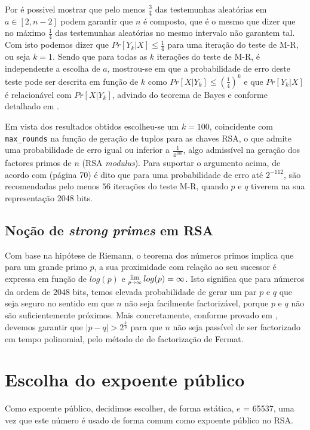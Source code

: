 \documentclass[dvipsnames]{article}
\newcommand{\Lim}[1]{\raisebox{0.5ex}{\scalebox{0.8}{$\displaystyle \lim_{#1}\;$}}}
\begin{document}

\noindent Por \cite{DBLP:journals/dcc/Lenstra00} é possivel mostrar que pelo menos $\frac{3}{4}$ das testemunhas aleatórias em $a \in [2,n-2]$ podem garantir que $n$ é composto, que é o mesmo que dizer que no máximo $\frac{1}{4}$ das testemunhas aleatórias no mesmo intervalo não garantem tal. Com isto podemos dizer que $Pr[Y_k|X] \leq \frac{1}{4}$ para uma iteração do teste de M-R, ou seja $k=1$. Sendo que para todas as $k$ iterações do teste de M-R, é independente a escolha de $a$, mostrou-se em \cite{1204.1657v2} que a probabilidade de erro deste teste pode ser descrita em função de $k$ como $Pr[X|Y_k] \leq (\frac{1}{4})^k$ e que $Pr[Y_k|X]$ é relacionável com $Pr[X|Y_k]$, advindo do teorema de Bayes e conforme detalhado em \cite{1709.09963}.

\vskip 0.4cm

\noindent Em vista dos resultados obtidos escolheu-se um $k=100$, coincidente com \texttt{max\_rounds} na função de geração de tuplos para as chaves RSA, o que admite uma probabilidade de erro igual ou inferior a $\frac{1}{4^{100}}$, algo admissível na geração dos factores primos de $n$ (RSA \textit{modulus}). Para suportar o argumento acima, de acordo com \cite{FIPS} (página 70) é dito que para uma probabilidade de erro até $2^{-112}$, são recomendadas pelo menos $56$ iterações do teste M-R, quando $p$ e $q$ tiverem na sua representação 2048 bits.

\subsection{Noção de \textit{strong primes} em RSA}

Com base na hipótese de Riemann, o teorema dos números primos \cite{rh} implica que para um grande primo $p$, a sua proximidade com relação ao seu sucessor é expressa em função de $log(p)$ e $\Lim{p \rightarrow \infty}log(p) = \infty$. Isto significa que para números da ordem de $2048$ bits, temos elevada probabilidade de gerar um par $p$ e $q$ que seja seguro no sentido em que $n$ não seja facilmente factorizável, porque $p$ e $q$ não são suficientemente próximos. Mais concretamente, conforme provado em \cite{DBLP:journals/iacr/ErraG09}, devemos garantir que $|p-q| > 2^{\frac{k}{3}}$ para que $n$ não seja passível de ser factorizado em tempo polinomial, pelo método de de factorização de Fermat.

\section{Escolha do expoente público}
Como expoente público, decidimos escolher, de forma estática, $e$ =  65537, uma vez que este número é usado de forma comum como expoente público no RSA.
\end{document}
